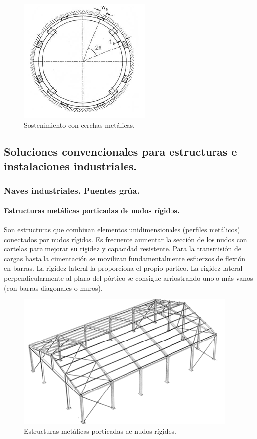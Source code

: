 \begin{itemize}
    \begin{figure}[h]
        \centering
        \includegraphics[width=0.5\linewidth]{Imagenes/Sostenimiento con cerchas metalicas.png}
        \caption{Sostenimiento con cerchas metálicas.}
        \label{fig:Cerchas Metalicas}
    \end{figure}
    
\end{itemize}

\subsection{Soluciones convencionales para estructuras e instalaciones industriales.}

\subsubsection{Naves industriales. Puentes grúa.}

\paragraph{Estructuras metálicas porticadas de nudos rígidos.}
Son estructuras que combinan elementos unidimensionales (perfiles metálicos) conectados por nudos rígidos. Es frecuente aumentar la sección de los nudos con cartelas para mejorar su rigidez y capacidad resistente. Para la transmisión de cargas hasta la cimentación se movilizan fundamentalmente esfuerzos de flexión en barras. La rigidez lateral la proporciona el propio pórtico. La rigidez lateral perpendicularmente al plano del pórtico se consigue arriostrando uno o más vanos (con barras diagonales o muros).

\begin{figure}[h]
    \centering
    \includegraphics[width=0.75\linewidth]{Imagenes/Est meta de nudos rigidos.png}
    \caption{Estructuras metálicas porticadas de nudos rígidos.}
\end{figure}

